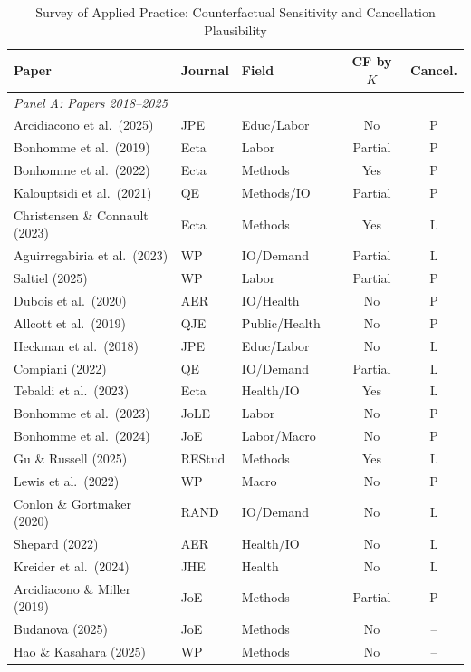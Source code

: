 \documentclass[12pt]{article}
\begin{document}
\begin{table}[H]
\centering
\caption{Survey of Applied Practice: Counterfactual Sensitivity and Cancellation Plausibility}
\label{tab:survey_classification}
\begin{threeparttable}
\footnotesize
\begin{tabular}{llllcc}
\toprule
Paper & Journal & Field & & CF by $K$ & Cancel. \\
\midrule
\multicolumn{6}{l}{\textit{Panel A: Papers 2018--2025}} \\[2pt]
Arcidiacono et al.\ (2025) & JPE & Educ/Labor & & No & P \\
Bonhomme et al.\ (2019) & Ecta & Labor & & Partial & P \\
Bonhomme et al.\ (2022) & Ecta & Methods & & Yes & P \\
Kalouptsidi et al.\ (2021) & QE & Methods/IO & & Partial & P \\
Christensen \& Connault (2023) & Ecta & Methods & & Yes & L \\
Aguirregabiria et al.\ (2023) & WP & IO/Demand & & Partial & L \\
Saltiel (2025) & WP & Labor & & Partial & P \\
Dubois et al.\ (2020) & AER & IO/Health & & No & P \\
Allcott et al.\ (2019) & QJE & Public/Health & & No & P \\
Heckman et al.\ (2018) & JPE & Educ/Labor & & No & L \\
Compiani (2022) & QE & IO/Demand & & Partial & L \\
Tebaldi et al.\ (2023) & Ecta & Health/IO & & Yes & L \\
Bonhomme et al.\ (2023) & JoLE & Labor & & No & P \\
Bonhomme et al.\ (2024) & JoE & Labor/Macro & & No & P \\
Gu \& Russell (2025) & REStud & Methods & & Yes & L \\
Lewis et al.\ (2022) & WP & Macro & & No & P \\
Conlon \& Gortmaker (2020) & RAND & IO/Demand & & No & L \\
Shepard (2022) & AER & Health/IO & & No & L \\
Kreider et al.\ (2024) & JHE & Health & & No & L \\
Arcidiacono \& Miller (2019) & JoE & Methods & & Partial & P \\
Budanova (2025) & JoE & Methods & & No & -- \\
Hao \& Kasahara (2025) & WP & Methods & & No & -- \\

\end{tabular}
\end{threeparttable}
\end{table}
\end{document}

